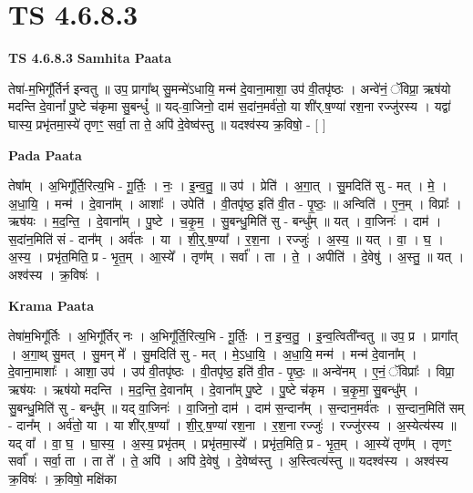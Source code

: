 \documentclass[17pt]{extarticle}
\begin{document}
\section{ TS 4.6.8.3 }

\textbf{TS 4.6.8.3 } \newline
\textbf{Samhita Paata} \newline

तेषा॑-म॒भिगू᳚र्तिर्न इन्वतु ॥ उप॒ प्रागा᳚थ् सु॒मन्मे॑ऽधायि॒ मन्म॑ दे॒वाना॒माशा॒ उप॑ वी॒तपृ॑ष्ठः । अन्वे॑नं॒ ॅविप्रा॒ ऋष॑यो मदन्ति दे॒वानां᳚ पु॒ष्टे च॑कृमा सु॒बन्धुं᳚ ॥ यद्-वा॒जिनो॒ दाम॑ स॒दांन॒मर्व॑तो॒ या शी॑र्.ष॒ण्या॑ रश॒ना रज्जु॑रस्य । यद्वा॑ घास्य॒ प्रभृ॑तमा॒स्ये॑ तृणꣳ॒॒ सर्वा॒ ता ते॒ अपि॑ दे॒वेष्व॑स्तु ॥ यदश्व॑स्य क्र॒विषो॒ - [  ] \newline

\textbf{Pada Paata} \newline

तेषा᳚म् । अ॒भिगू᳚र्ति॒रित्य॒भि - गू॒र्तिः॒ । नः॒ । इ॒न्व॒तु॒ ॥ उप॑ । प्रेति॑ । अ॒गा॒त् । सु॒मदिति॑ सु - मत् । मे॒ । अ॒धा॒यि॒ । मन्म॑ । दे॒वाना᳚म् । आशाः᳚ । उपेति॑ । वी॒तपृ॑ष्ठ॒ इति॑ वी॒त - पृ॒ष्ठः॒ ॥ अन्विति॑ । ए॒न॒म् । विप्राः᳚ । ऋष॑यः । म॒द॒न्ति॒ । दे॒वाना᳚म् । पु॒ष्टे । च॒कृ॒म॒ । सु॒बन्धु॒मिति॑ सु - बन्धु᳚म् ॥ यत् । वा॒जिनः॑ । दाम॑ । स॒दांन॒मिति॑ सं - दान᳚म् । अर्व॑तः । या । शी॒र्॒.ष॒ण्या᳚ । र॒श॒ना । रज्जुः॑ । अ॒स्य॒ ॥ यत् । वा॒ । घ॒ । अ॒स्य॒ । प्रभृ॑त॒मिति॒ प्र - भृ॒त॒म् । आ॒स्ये᳚ । तृण᳚म् । सर्वा᳚ । ता । ते॒ । अपीति॑ । दे॒वेषु॑ । अ॒स्तु॒ ॥ यत् । अश्व॑स्य । क्र॒विषः॑ ।  \newline


\textbf{Krama Paata} \newline

तेषा॑म॒भिगू᳚र्तिः । अ॒भिगू᳚र्तिर् नः । अ॒भिगू᳚र्ति॒रित्य॒भि - गू॒र्तिः॒ । न॒ इ॒न्व॒तु॒ । इ॒न्व॒त्विती᳚न्वतु ॥ उप॒ प्र । प्रागा᳚त् । अ॒गा॒थ् सु॒मत् । सु॒मन् मे᳚ । सु॒मदिति॑ सु - मत् । मे॒ऽधा॒यि॒ । अ॒धा॒यि॒ मन्म॑ । मन्म॑ दे॒वाना᳚म् । दे॒वाना॒माशाः᳚ । आशा॒ उप॑ । उप॑ वी॒तपृ॑ष्ठः । वी॒तपृ॑ष्ठ॒ इति॑ वी॒त - पृ॒ष्ठः॒ ॥ अन्वे॑नम् । ए॒नं॒ ॅविप्राः᳚ । विप्रा॒ ऋष॑यः । ऋष॑यो मदन्ति । म॒द॒न्ति॒ दे॒वाना᳚म् । दे॒वाना᳚म् पु॒ष्टे । पु॒ष्टे च॑कृम । च॒कृ॒मा॒ सु॒बन्धु᳚म् । सु॒बन्धु॒मिति॑ सु - बन्धु᳚म् ॥ यद् वा॒जिनः॑ । वा॒जिनो॒ दाम॑ । दाम॑ स॒न्दान᳚म् । स॒न्दान॒मर्व॑तः । स॒न्दान॒मिति॑ सम् - दान᳚म् । अर्व॑तो॒ या । या शी॑र्.ष॒ण्या᳚ । शी॒र्॒.ष॒ण्या॑ रश॒ना । र॒श॒ना रज्जुः॑ । रज्जु॑रस्य । अ॒स्येत्य॑स्य ॥ यद् वा᳚ । वा॒ घ॒ । घा॒स्य॒ । अ॒स्य॒ प्रभृ॑तम् । प्रभृ॑तमा॒स्ये᳚ । प्रभृ॑त॒मिति॒ प्र - भृ॒त॒म् । आ॒स्ये॑ तृण᳚म् । तृणꣳ॒॒ सर्वा᳚ । सर्वा॒ ता । ता ते᳚ । ते॒ अपि॑ । अपि॑ दे॒वेषु॑ । दे॒वेष्व॑स्तु । अ॒स्त्वित्य॑स्तु ॥ यदश्व॑स्य । अश्व॑स्य क्र॒विषः॑ । क्र॒विषो॒ मक्षि॑का \newline
\end{document}
